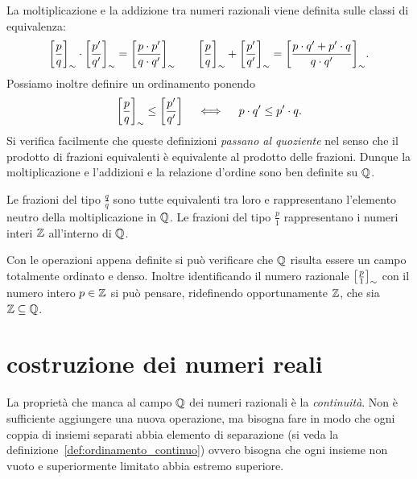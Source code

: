 %
La moltiplicazione e la addizione tra numeri razionali viene definita
sulle classi di equivalenza:
\[
 {\left[ \frac p q \right]}_\sim \cdot {\left[ \frac{p'}{q'} \right]}_\sim 
 = {\left[ \frac{p\cdot p'}{q\cdot q'} \right]}_\sim 
 \qquad 
 {\left[ \frac{p}{q} \right]}_\sim + {\left[ \frac{p'}{q'} \right]}_\sim 
 = {\left[ \frac{p\cdot q' + p'\cdot q}{q\cdot q'} \right]}_\sim.
\]
Possiamo inoltre definire un ordinamento ponendo
\[
 {\left[ \frac p q \right]}_\sim \le {\left[ \frac{p'}{q'} \right]}
 \quad\iff  \quad p \cdot q' \le p' \cdot q.
\]
Si verifica facilmente che queste definizioni \emph{passano al quoziente} 
nel senso che il prodotto di frazioni equivalenti è equivalente al prodotto 
delle frazioni. 
Dunque la moltiplicazione e l'addizioni 
e la relazione d'ordine sono ben definite su ${\mathbb Q}$.

Le frazioni del tipo $\frac{q}{q}$ sono tutte equivalenti tra loro e rappresentano 
l'elemento neutro della moltiplicazione in ${\mathbb Q}$.
Le frazioni del tipo $\frac{p}{1}$ rappresentano 
i numeri interi ${\mathbb Z}$ all'interno di ${\mathbb Q}$.

Con le operazioni appena definite si può verificare che ${\mathbb Q}$ 
risulta essere un campo totalmente ordinato e denso.
Inoltre identificando il numero razionale ${\left[ \frac p 1 \right]}_\sim$
con il numero intero $p\in {\mathbb Z}$ si può pensare, ridefinendo opportunamente 
${\mathbb Z}$, che sia ${\mathbb Z} \subseteq {\mathbb Q}$.

\section{costruzione dei numeri reali}
\label{sec:costruzione_reali}

La proprietà che manca al campo ${\mathbb Q}$ dei numeri razionali 
è la \emph{continuità}. 
Non è sufficiente aggiungere una nuova operazione, ma bisogna 
fare in modo che ogni coppia di insiemi separati 
abbia elemento di separazione 
(si veda la definizione~\ref{def:ordinamento_continuo})
ovvero bisogna che ogni insieme non vuoto e superiormente 
limitato abbia estremo superiore.

